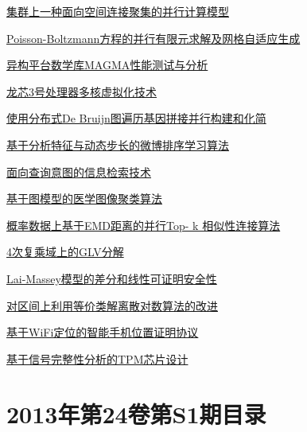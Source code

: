 \documentclass[a4paper]{article}
\begin{document}
\href{http://www.jos.org.cn/ch/reader/download_pdf.aspx?file_no=13028&year_id=2013&quarter_id=S2&falg=1}{集群上一种面向空间连接聚集的并行计算模型}

\href{http://www.jos.org.cn/ch/reader/download_pdf.aspx?file_no=13029&year_id=2013&quarter_id=S2&falg=1}{Poisson-Boltzmann方程的并行有限元求解及网格自适应生成}

\href{http://www.jos.org.cn/ch/reader/download_pdf.aspx?file_no=13030&year_id=2013&quarter_id=S2&falg=1}{异构平台数学库MAGMA性能测试与分析}

\href{http://www.jos.org.cn/ch/reader/download_pdf.aspx?file_no=13031&year_id=2013&quarter_id=S2&falg=1}{龙芯3号处理器多核虚拟化技术}

\href{http://www.jos.org.cn/ch/reader/download_pdf.aspx?file_no=13032&year_id=2013&quarter_id=S2&falg=1}{使用分布式De Bruijn图遍历基因拼接并行构建和化简}

\href{http://www.jos.org.cn/ch/reader/download_pdf.aspx?file_no=13033&year_id=2013&quarter_id=S2&falg=1}{基于分析特征与动态步长的微博排序学习算法}

\href{http://www.jos.org.cn/ch/reader/download_pdf.aspx?file_no=13034&year_id=2013&quarter_id=S2&falg=1}{面向查询意图的信息检索技术}

\href{http://www.jos.org.cn/ch/reader/download_pdf.aspx?file_no=13035&year_id=2013&quarter_id=S2&falg=1}{基于图模型的医学图像聚类算法}

\href{http://www.jos.org.cn/ch/reader/download_pdf.aspx?file_no=13036&year_id=2013&quarter_id=S2&falg=1}{概率数据上基于EMD距离的并行Top- k 相似性连接算法}

\href{http://www.jos.org.cn/ch/reader/download_pdf.aspx?file_no=13037&year_id=2013&quarter_id=S2&falg=1}{4次复乘域上的GLV分解}

\href{http://www.jos.org.cn/ch/reader/download_pdf.aspx?file_no=13038&year_id=2013&quarter_id=S2&falg=1}{Lai-Massey模型的差分和线性可证明安全性}

\href{http://www.jos.org.cn/ch/reader/download_pdf.aspx?file_no=13039&year_id=2013&quarter_id=S2&falg=1}{对区间上利用等价类解离散对数算法的改进}

\href{http://www.jos.org.cn/ch/reader/download_pdf.aspx?file_no=13040&year_id=2013&quarter_id=S2&falg=1}{基于WiFi定位的智能手机位置证明协议}

\href{http://www.jos.org.cn/ch/reader/download_pdf.aspx?file_no=13041&year_id=2013&quarter_id=S2&falg=1}{基于信号完整性分析的TPM芯片设计}


\section{\textbf{2013年第24卷第S1期目录}}
\end{document}

